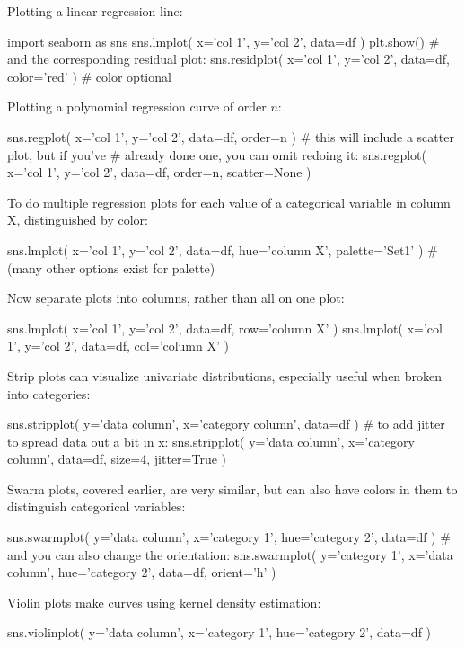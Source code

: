 \documentclass[a4paper,landscape,columns=3]{cheatsheet}
\begin{document}
Plotting a linear regression line:
\begin{python}
import seaborn as sns
sns.lmplot( x='col 1', y='col 2', data=df )
plt.show()
# and the corresponding residual plot:
sns.residplot( x='col 1', y='col 2', data=df,
               color='red' )  # color optional
\end{python}

Plotting a polynomial regression curve of order $n$:
\begin{python}
sns.regplot( x='col 1', y='col 2', data=df,
             order=n )
# this will include a scatter plot, but if you've
# already done one, you can omit redoing it:
sns.regplot( x='col 1', y='col 2', data=df,
             order=n, scatter=None )
\end{python}

To do multiple regression plots for each value of a categorical variable in column X, distinguished by color:
\begin{python}
sns.lmplot( x='col 1', y='col 2', data=df,
            hue='column X', palette='Set1' )
# (many other options exist for palette)
\end{python}

Now separate plots into columns, rather than all on one plot:
\begin{python}
sns.lmplot( x='col 1', y='col 2', data=df,
            row='column X' )
sns.lmplot( x='col 1', y='col 2', data=df,
            col='column X' )
\end{python}

Strip plots can visualize univariate distributions, especially useful when broken into categories:
\begin{python}
sns.stripplot( y='data column', x='category column',
               data=df )
# to add jitter to spread data out a bit in x:
sns.stripplot( y='data column', x='category column',
               data=df, size=4, jitter=True )
\end{python}

Swarm plots, covered earlier, are very similar, but can also have colors in them to distinguish categorical variables:
\begin{python}
sns.swarmplot( y='data column', x='category 1',
               hue='category 2', data=df )
# and you can also change the orientation:
sns.swarmplot( y='category 1', x='data column',
               hue='category 2', data=df,
               orient='h' )
\end{python}

Violin plots make curves using kernel density estimation:
\begin{python}
sns.violinplot( y='data column', x='category 1',
                hue='category 2', data=df )
\end{python}
\end{document}
